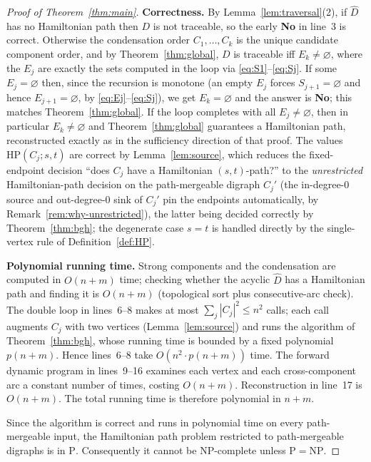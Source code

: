 \documentclass[12pt]{article}
\theoremstyle{definition}
\begin{document}
\begin{proof}[Proof of Theorem~\ref{thm:main}]
\textbf{Correctness.}
By Lemma~\ref{lem:traversal}(2), if $\widehat D$ has no Hamiltonian path then $D$
is not traceable, so the early \textbf{No} in line~3 is correct. Otherwise the
condensation order $C_{1},\dots,C_{k}$ is the unique candidate component order, and
by Theorem~\ref{thm:global}, $D$ is traceable iff $E_{k}\neq\varnothing$, where the
$E_{j}$ are exactly the sets computed in the loop via
\eqref{eq:S1}--\eqref{eq:Sj}. If some $E_{j}=\varnothing$ then, since the recursion
is monotone (an empty $E_{j}$ forces $S_{j+1}=\varnothing$ and hence
$E_{j+1}=\varnothing$, by \eqref{eq:Ej}--\eqref{eq:Sj}), we get $E_{k}=\varnothing$
and the answer is \textbf{No}; this matches Theorem~\ref{thm:global}. If the loop
completes with all $E_{j}\neq\varnothing$, then in particular $E_{k}\neq\varnothing$
and Theorem~\ref{thm:global} guarantees a Hamiltonian path, reconstructed exactly
as in the sufficiency direction of that proof. The values
$\mathrm{HP}(C_{j};s,t)$ are correct by Lemma~\ref{lem:source}, which reduces the
fixed-endpoint decision ``does $C_{j}$ have a Hamiltonian $(s,t)$-path?'' to the
\emph{unrestricted} Hamiltonian-path decision on the path-mergeable digraph
$C_{j}'$ (the in-degree-$0$ source and out-degree-$0$ sink of $C_{j}'$ pin the
endpoints automatically, by Remark~\ref{rem:why-unrestricted}), the latter being
decided correctly by Theorem~\ref{thm:bgh}; the degenerate case $s=t$ is handled
directly by the single-vertex rule of Definition~\ref{def:HP}.

\textbf{Polynomial running time.}
Strong components and the condensation are computed in $O(n+m)$ time; checking
whether the acyclic $\widehat D$ has a Hamiltonian path and finding it is $O(n+m)$
(topological sort plus consecutive-arc check). The double loop in lines~6--8 makes
at most $\sum_{j}|C_{j}|^{2}\le n^{2}$ calls; each call augments $C_{j}$ with two
vertices (Lemma~\ref{lem:source}) and runs the algorithm of
Theorem~\ref{thm:bgh}, whose running time is bounded by a fixed polynomial
$p(n+m)$. Hence lines~6--8 take $O(n^{2}\cdot p(n+m))$ time. The forward dynamic
program in lines~9--16 examines each vertex and each cross-component arc a constant
number of times, costing $O(n+m)$. Reconstruction in line~17 is $O(n+m)$. The total
running time is therefore polynomial in $n+m$.

Since the algorithm is correct and runs in polynomial time on every path-mergeable
input, the Hamiltonian path problem restricted to path-mergeable digraphs is in
$\mathrm{P}$. Consequently it cannot be NP-complete unless $\mathrm{P}=\mathrm{NP}$.
\end{proof}
\end{document}
